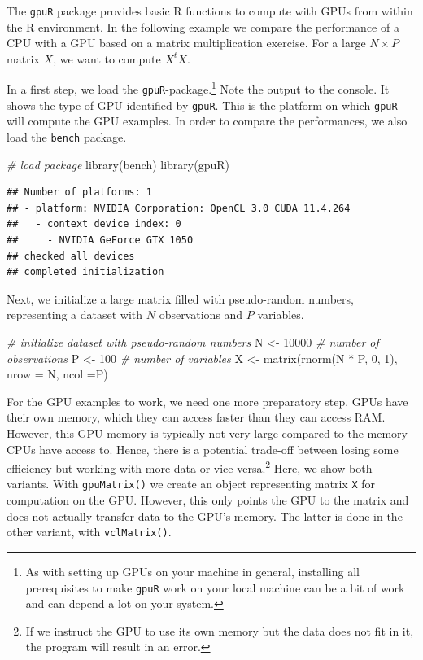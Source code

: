 \documentclass[
  12pt,
]{style/krantz}
\newenvironment{Shaded}{\begin{snugshade}}{\end{snugshade}}
\newcommand{\AttributeTok}[1]{\textcolor[rgb]{0.77,0.63,0.00}{#1}}
\newcommand{\CommentTok}[1]{\textcolor[rgb]{0.56,0.35,0.01}{\textit{#1}}}
\newcommand{\DecValTok}[1]{\textcolor[rgb]{0.00,0.00,0.81}{#1}}
\newcommand{\FunctionTok}[1]{\textcolor[rgb]{0.00,0.00,0.00}{#1}}
\newcommand{\NormalTok}[1]{#1}
\newcommand{\OtherTok}[1]{\textcolor[rgb]{0.56,0.35,0.01}{#1}}
\newcommand{\SpecialCharTok}[1]{\textcolor[rgb]{0.00,0.00,0.00}{#1}}
\begin{document}
The \texttt{gpuR} package provides basic R functions to compute with GPUs from within the R environment. In the following example we compare the performance of a CPU with a GPU based on a matrix multiplication exercise. For a large \(N\times P\) matrix \(X\), we want to compute \(X^tX\).

In a first step, we load the \texttt{gpuR}-package.\footnote{As with setting up GPUs on your machine in general, installing all prerequisites to make \texttt{gpuR} work on your local machine can be a bit of work and can depend a lot on your system.} Note the output to the console. It shows the type of GPU identified by \texttt{gpuR}. This is the platform on which \texttt{gpuR} will compute the GPU examples. In order to compare the performances, we also load the \texttt{bench} package.

\begin{Shaded}
\begin{Highlighting}[]
\CommentTok{\# load package}
\FunctionTok{library}\NormalTok{(bench)}
\FunctionTok{library}\NormalTok{(gpuR)}
\end{Highlighting}
\end{Shaded}

\begin{verbatim}
## Number of platforms: 1
## - platform: NVIDIA Corporation: OpenCL 3.0 CUDA 11.4.264
##   - context device index: 0
##     - NVIDIA GeForce GTX 1050
## checked all devices
## completed initialization
\end{verbatim}

Next, we initialize a large matrix filled with pseudo-random numbers, representing a dataset with \(N\) observations and \(P\) variables.

\begin{Shaded}
\begin{Highlighting}[]
\CommentTok{\# initialize dataset with pseudo{-}random numbers}
\NormalTok{N }\OtherTok{\textless{}{-}} \DecValTok{10000}  \CommentTok{\# number of observations}
\NormalTok{P }\OtherTok{\textless{}{-}} \DecValTok{100} \CommentTok{\# number of variables}
\NormalTok{X }\OtherTok{\textless{}{-}} \FunctionTok{matrix}\NormalTok{(}\FunctionTok{rnorm}\NormalTok{(N }\SpecialCharTok{*}\NormalTok{ P, }\DecValTok{0}\NormalTok{, }\DecValTok{1}\NormalTok{), }\AttributeTok{nrow =}\NormalTok{ N, }\AttributeTok{ncol =}\NormalTok{P)}
\end{Highlighting}
\end{Shaded}

For the GPU examples to work, we need one more preparatory step. GPUs have their own memory, which they can access faster than they can access RAM. However, this GPU memory is typically not very large compared to the memory CPUs have access to. Hence, there is a potential trade-off between losing some efficiency but working with more data or vice versa.\footnote{If we instruct the GPU to use its own memory but the data does not fit in it, the program will result in an error.} Here, we show both variants. With \texttt{gpuMatrix()} we create an object representing matrix \texttt{X} for computation on the GPU. However, this only points the GPU to the matrix and does not actually transfer data to the GPU's memory. The latter is done in the other variant, with \texttt{vclMatrix()}.
\end{document}
